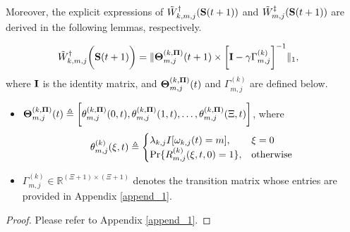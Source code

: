 Moreover, the explicit expressions of $\tilde{W}^{\dagger}_{k,m,j}(\mathbf{S}(t+1))$ and $\tilde{W}^{\ddagger}_{m,j}(\mathbf{S}(t+1))$ are derived in the following lemmas, respectively.

\begin{lemma}
    \label{lemma:w_ap}
    \begin{align}
        &\tilde{W}^{\dagger}_{k,m,j}\bigg(\mathbf{S}(t+1)\bigg) =
        \lVert
            \boldsymbol{\Theta}^{(k, \boldsymbol{\Pi})}_{m,j}(t+1) \times
            \bigg[
                \mathbf{I} - \gamma \Gamma^{(k)}_{m,j}
            \bigg]^{-1}
        \|_1,
        \label{w_ap}
    \end{align}
    where $\mathbf{I}$ is the identity matrix, and $\boldsymbol{\Theta}^{(k, \boldsymbol{\Pi})}_{m,j}(t)$ and $\Gamma^{(k)}_{m,j}$ are defined below.
    \begin{itemize}
        \item {\small $\boldsymbol{\Theta}^{(k,\boldsymbol{\Pi})}_{m,j}(t) \triangleq \bigg[
            \theta^{(k,\boldsymbol{\Pi})}_{m,j}(0,t),
            \theta^{(k,\boldsymbol{\Pi})}_{m,j}(1,t),
            \dots,
            \theta^{(k,\boldsymbol{\Pi})}_{m,j}(\Xi,t)
            \bigg]$},
        where 
        \begin{align}
            \theta^{(k)}_{m,j}(\xi,t) \triangleq 
            \begin{cases}
                \lambda_{k,j} I[\omega_{k,j}(t)=m], & \xi=0
                \\
                \Pr\{R^{(k)}_{m,j}(\xi,t,0) = 1\}, & \text{otherwise}
            \end{cases}
        \end{align}
        \item $\Gamma^{(k)}_{m,j} \in \mathbb{R}^{(\Xi+1)\times(\Xi+1)}$ denotes the transition matrix whose entries are provided in Appendix \ref{append_1}.
    \end{itemize}
\end{lemma}
\begin{proof}
    Please refer to Appendix \ref{append_1}.
\end{proof}

